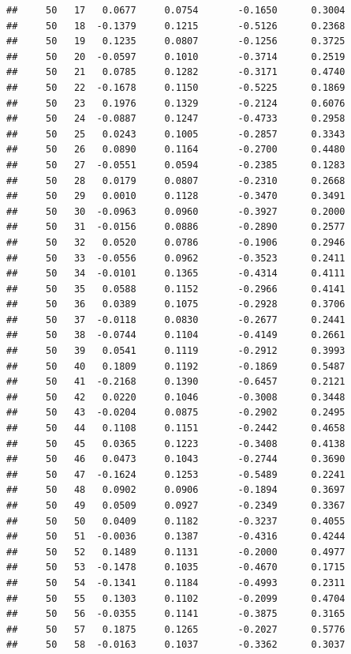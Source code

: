 \documentclass[
]{article}
\begin{document}
\begin{verbatim}
##     50   17   0.0677     0.0754       -0.1650      0.3004 
##     50   18  -0.1379     0.1215       -0.5126      0.2368 
##     50   19   0.1235     0.0807       -0.1256      0.3725 
##     50   20  -0.0597     0.1010       -0.3714      0.2519 
##     50   21   0.0785     0.1282       -0.3171      0.4740 
##     50   22  -0.1678     0.1150       -0.5225      0.1869 
##     50   23   0.1976     0.1329       -0.2124      0.6076 
##     50   24  -0.0887     0.1247       -0.4733      0.2958 
##     50   25   0.0243     0.1005       -0.2857      0.3343 
##     50   26   0.0890     0.1164       -0.2700      0.4480 
##     50   27  -0.0551     0.0594       -0.2385      0.1283 
##     50   28   0.0179     0.0807       -0.2310      0.2668 
##     50   29   0.0010     0.1128       -0.3470      0.3491 
##     50   30  -0.0963     0.0960       -0.3927      0.2000 
##     50   31  -0.0156     0.0886       -0.2890      0.2577 
##     50   32   0.0520     0.0786       -0.1906      0.2946 
##     50   33  -0.0556     0.0962       -0.3523      0.2411 
##     50   34  -0.0101     0.1365       -0.4314      0.4111 
##     50   35   0.0588     0.1152       -0.2966      0.4141 
##     50   36   0.0389     0.1075       -0.2928      0.3706 
##     50   37  -0.0118     0.0830       -0.2677      0.2441 
##     50   38  -0.0744     0.1104       -0.4149      0.2661 
##     50   39   0.0541     0.1119       -0.2912      0.3993 
##     50   40   0.1809     0.1192       -0.1869      0.5487 
##     50   41  -0.2168     0.1390       -0.6457      0.2121 
##     50   42   0.0220     0.1046       -0.3008      0.3448 
##     50   43  -0.0204     0.0875       -0.2902      0.2495 
##     50   44   0.1108     0.1151       -0.2442      0.4658 
##     50   45   0.0365     0.1223       -0.3408      0.4138 
##     50   46   0.0473     0.1043       -0.2744      0.3690 
##     50   47  -0.1624     0.1253       -0.5489      0.2241 
##     50   48   0.0902     0.0906       -0.1894      0.3697 
##     50   49   0.0509     0.0927       -0.2349      0.3367 
##     50   50   0.0409     0.1182       -0.3237      0.4055 
##     50   51  -0.0036     0.1387       -0.4316      0.4244 
##     50   52   0.1489     0.1131       -0.2000      0.4977 
##     50   53  -0.1478     0.1035       -0.4670      0.1715 
##     50   54  -0.1341     0.1184       -0.4993      0.2311 
##     50   55   0.1303     0.1102       -0.2099      0.4704 
##     50   56  -0.0355     0.1141       -0.3875      0.3165 
##     50   57   0.1875     0.1265       -0.2027      0.5776 
##     50   58  -0.0163     0.1037       -0.3362      0.3037 

\end{verbatim}
\end{document}
